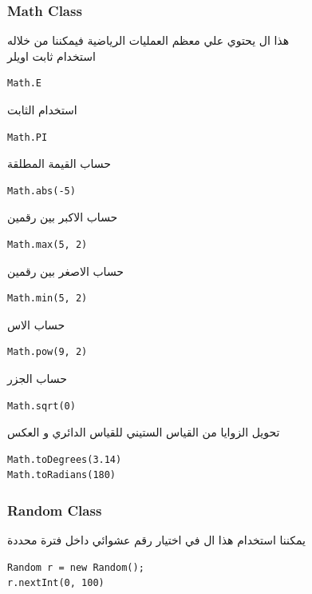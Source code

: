 \subsubsection{Math Class}
\begin{AR}
هذا ال يحتوي علي معظم العمليات الرياضية فيمكننا من خلاله 
\\
استخدام ثابت اويلر 
\end{AR}
\begin{verbatim}
Math.E  
\end{verbatim}
\begin{AR}
  استخدام الثابت  
\end{AR}
\begin{verbatim}
Math.PI  
\end{verbatim}
\begin{AR}
  حساب القيمة المطلقة 
\end{AR}
\begin{verbatim}
Math.abs(-5)  
\end{verbatim}
\begin{AR}
  حساب الاكبر بين رقمين
\end{AR}
\begin{verbatim}
Math.max(5, 2)
\end{verbatim}
\begin{AR}
  حساب الاصغر بين رقمين
\end{AR}
\begin{verbatim}
Math.min(5, 2)  
\end{verbatim}
\begin{AR}
  حساب الاس 
\end{AR}
\begin{verbatim}
Math.pow(9, 2)  
\end{verbatim}
\begin{AR}
  حساب الجزر 
\end{AR}
\begin{verbatim}
Math.sqrt(0)  
\end{verbatim}
\begin{AR}
  تحويل الزوايا من القياس الستيني للقياس الدائري و العكس 
\end{AR}
\begin{verbatim}
Math.toDegrees(3.14)
Math.toRadians(180)  
\end{verbatim}

\subsubsection{Random Class}
\begin{AR}
يمكننا استخدام هذا ال  في اختيار رقم عشوائي داخل فترة محددة 
\end{AR}
\begin{verbatim}
Random r = new Random();
r.nextInt(0, 100)
\end{verbatim}
\newpage